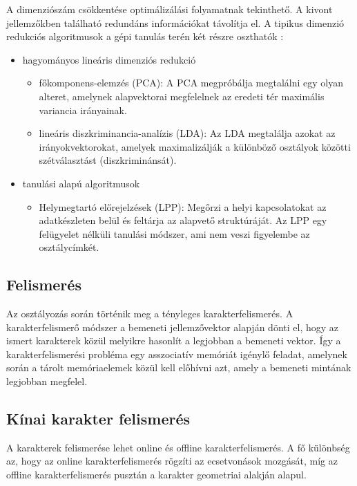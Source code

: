A dimenziószám csökkentése optimálizálási folyamatnak tekinthető. A kivont jellemzőkben található redundáns információkat távolítja el. A tipikus dimenzió redukciós algoritmusok a gépi tanulás terén két részre oszthatók \cite{zhang2009patch}:
\begin{itemize}
\item hagyományos lineáris dimenziós redukció
	\begin{itemize}
	\item főkomponens-elemzés (PCA)\cite{gao2012dimensionality}: A PCA megpróbálja megtalálni egy olyan alteret, amelynek alapvektorai megfelelnek az eredeti tér maximális variancia irányainak.
	\item lineáris diszkriminancia-analízis (LDA)\cite{gao2012dimensionality}: Az LDA megtalálja azokat az irányokvektorokat, amelyek maximalizálják a különböző osztályok közötti szétválasztást (diszkriminánsát).
	\end{itemize}
\item tanulási alapú algoritmusok
	\begin{itemize}
	\item Helymegtartó előrejelzések (LPP)\cite{gao2012dimensionality}: Megőrzi a helyi kapcsolatokat az adatkészleten belül és feltárja az alapvető struktúráját. Az LPP egy felügyelet nélküli tanulási módszer, ami nem veszi figyelembe az osztálycímkét.
	\end{itemize}
\end{itemize}


\subsection{Felismerés}

Az osztályozás során történik meg a tényleges karakterfelismerés. A karakterfelismerő módszer a bemeneti jellemzővektor alapján dönti el, hogy az ismert karakterek közül melyikre hasonlít a legjobban a bemeneti vektor. Így a karakterfelismerési probléma egy asszociatív memóriát igénylő feladat, amelynek során a tárolt memóriaelemek közül kell előhívni azt, amely a bemeneti mintának legjobban megfelel.\\

\subsection{Kínai karakter felismerés}

A karakterek felismerése lehet online és offline karakterfelismerés. A fő különbség az, hogy az online karakterfelismerés rögzíti az ecsetvonások mozgását, míg az offline karakterfelismerés pusztán a karakter geometriai alakján alapul.

